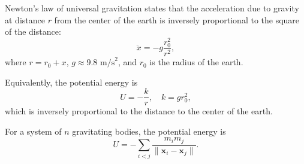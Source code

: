 Newton's law of universal gravitation states that the acceleration due to gravity at distance $r$ from the center of the earth is inversely proportional to the square of the distance:
$$\ddot{x} = -g \frac{r_0^2}{r^2},$$
where $r = r_0 + x$, $g \approx 9.8 \text{ m/s}^2$, and $r_0$ is the radius of the earth.

Equivalently, the potential energy is
$$U = -\frac{k}{r}, \quad k = gr_0^2,$$
which is inversely proportional to the distance to the center of the earth.

For a system of $n$ gravitating bodies, the potential energy is
$$U = -\sum_{i<j} \frac{m_i m_j}{\|\mathbf{x}_i - \mathbf{x}_j\|}.$$
